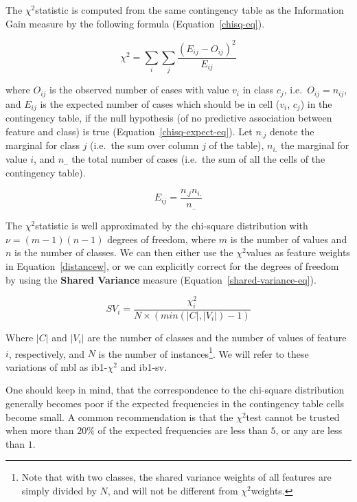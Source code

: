 \documentclass{report}
\newcommand{\chisq}{{$ \chi^2 $}}
\begin{document}
The \chisq statistic is computed from the same contingency table as
the Information Gain measure by the following formula
(Equation~\ref{chisq-eq}).

\begin{equation} 
\chi^{2} = \sum_{i} \sum_{j} \frac{(E_{ij} - O_{ij})^{2}}
				  {E_{ij}} 
\label{chisq-eq}
\end{equation} 

where $O_{ij}$ is the observed number of cases with value $v_{i}$ in
class $c_{j}$, i.e.~$O_{ij} = n_{ij}$, and $E_{ij}$ is the expected
number of cases which should be in cell ($v_{i}$, $c_{j}$) in the
contingency table, if the null hypothesis (of no predictive
association between feature and class) is true
(Equation~\ref{chisq-expect-eq}). Let $n_{.j}$ denote the marginal for
class $j$ (i.e.~the sum over column $j$ of the table), $n_{i.}$ the
marginal for value $i$, and $n_{..}$ the total number of cases
(i.e.~the sum of all the cells of the contingency table).

\begin{equation}
E_{ij} = \frac{n_{.j} n_{i.}}{n_{..}}
\label{chisq-expect-eq}
\end{equation}

The \chisq statistic is well approximated by the chi-square
distribution with $\nu = (m-1)(n-1)$ degrees of freedom, where $m$ is
the number of values and $n$ is the number of classes. We can then
either use the \chisq values as feature weights in
Equation~\ref{distancew}, or we can explicitly correct for the degrees
of freedom by using the {\bf Shared Variance} measure
(Equation~\ref{shared-variance-eq}).

\begin{equation}
SV_{i} = \frac{ \chi^2_{i}}{N \times ( min(|C|,|V_{i}|)-1 ) }
\label{shared-variance-eq}
\end{equation}

Where $|C|$ and $|V_{i}|$ are the number of classes and the number of
values of feature $i$, respectively, and $N$ is the number of
instances\footnote{Note that with two classes, the shared variance
weights of all features are simply divided by $N$, and will not be
different from \chisq weights.}. We will refer to these
variations of {\sc mbl} as {\sc ib1-\chisq} and {\sc ib1-sv}.

One should keep in mind, that the correspondence to the chi-square
distribution generally becomes poor if the expected frequencies in the
contingency table cells become small. A common recommendation is that
the \chisq test cannot be trusted when more than $20\%$ of the
expected frequencies are less than $5$, or any are less than $1$.
\end{document}
